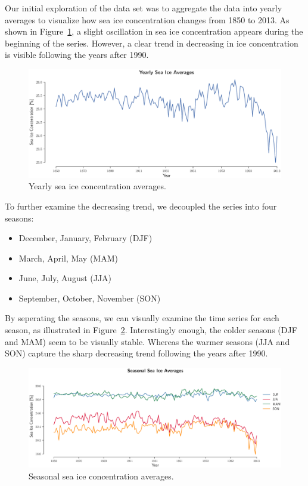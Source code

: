 \documentclass[12pt]{article}
\begin{document}
Our initial exploration of the data set was to aggregate the data into yearly averages to visualize how sea ice concentration changes from 1850 to 2013. As shown in Figure~\ref{yrly_avgs}, a slight oscillation in sea ice concentration appears during the beginning of the series. However, a clear trend in decreasing in ice concentration is visible following the years after 1990.

\begin{figure}[!htbp]
  \centering
  \includegraphics[scale=0.37]{figs/yrly_avgs}
  \caption{Yearly sea ice concentration averages.}\label{yrly_avgs}
\end{figure}

To further examine the decreasing trend, we decoupled the series into four seasons:
\begin{itemize}
\item December, January, February (DJF)
\item March, April, May (MAM)
\item June, July, August (JJA)
\item September, October, November (SON)
\end{itemize}

By seperating the seasons, we can visually examine the time series for each season, as illustrated in Figure~\ref{seasonal_avgs}. Interestingly enough, the colder seasons (DJF and MAM) seem to be visually stable. Whereas the warmer seasons (JJA and SON) capture the sharp decreasing trend following the years after 1990.
\begin{figure}[!htbp]
  \centering
  \includegraphics[scale=0.37]{figs/seasonal_avgs}
  \caption{Seasonal sea ice concentration averages.}\label{seasonal_avgs}
\end{figure}
\end{document}

